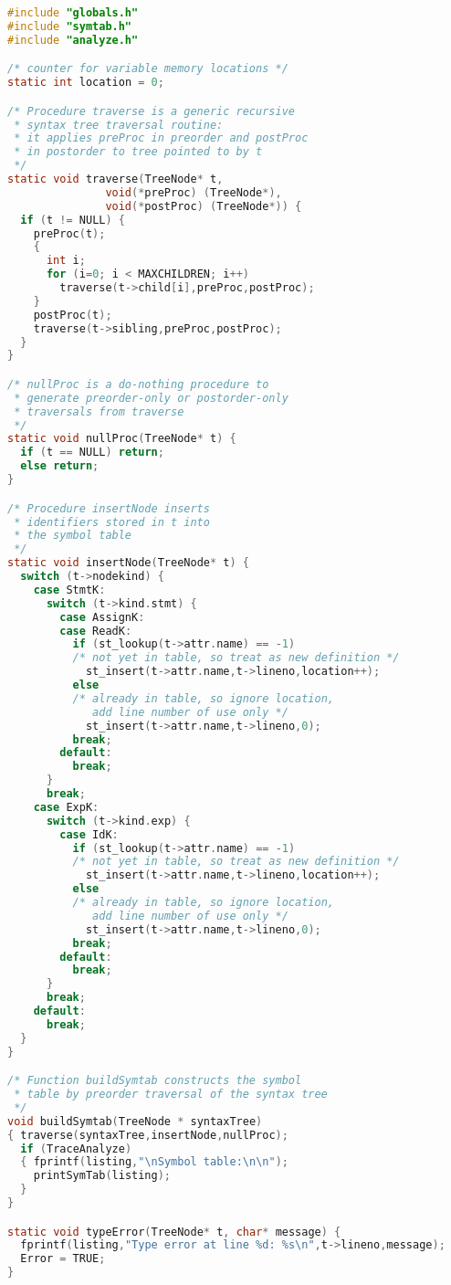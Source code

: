 \documentclass[lang=cn,10pt]{elegantbook}
\begin{document}
\begin{lstlisting}[caption={analyze.c},language=c]
#include "globals.h"
#include "symtab.h"
#include "analyze.h"

/* counter for variable memory locations */
static int location = 0;

/* Procedure traverse is a generic recursive 
 * syntax tree traversal routine:
 * it applies preProc in preorder and postProc 
 * in postorder to tree pointed to by t
 */
static void traverse(TreeNode* t,
               void(*preProc) (TreeNode*),
               void(*postProc) (TreeNode*)) {
  if (t != NULL) {
    preProc(t);
    {
      int i;
      for (i=0; i < MAXCHILDREN; i++)
        traverse(t->child[i],preProc,postProc);
    }
    postProc(t);
    traverse(t->sibling,preProc,postProc);
  }
}

/* nullProc is a do-nothing procedure to 
 * generate preorder-only or postorder-only
 * traversals from traverse
 */
static void nullProc(TreeNode* t) {
  if (t == NULL) return;
  else return;
}

/* Procedure insertNode inserts 
 * identifiers stored in t into 
 * the symbol table 
 */
static void insertNode(TreeNode* t) {
  switch (t->nodekind) {
    case StmtK:
      switch (t->kind.stmt) {
        case AssignK:
        case ReadK:
          if (st_lookup(t->attr.name) == -1)
          /* not yet in table, so treat as new definition */
            st_insert(t->attr.name,t->lineno,location++);
          else
          /* already in table, so ignore location, 
             add line number of use only */ 
            st_insert(t->attr.name,t->lineno,0);
          break;
        default:
          break;
      }
      break;
    case ExpK:
      switch (t->kind.exp) {
        case IdK:
          if (st_lookup(t->attr.name) == -1)
          /* not yet in table, so treat as new definition */
            st_insert(t->attr.name,t->lineno,location++);
          else
          /* already in table, so ignore location, 
             add line number of use only */ 
            st_insert(t->attr.name,t->lineno,0);
          break;
        default:
          break;
      }
      break;
    default:
      break;
  }
}

/* Function buildSymtab constructs the symbol 
 * table by preorder traversal of the syntax tree
 */
void buildSymtab(TreeNode * syntaxTree)
{ traverse(syntaxTree,insertNode,nullProc);
  if (TraceAnalyze)
  { fprintf(listing,"\nSymbol table:\n\n");
    printSymTab(listing);
  }
}

static void typeError(TreeNode* t, char* message) {
  fprintf(listing,"Type error at line %d: %s\n",t->lineno,message);
  Error = TRUE;
}


\end{lstlisting}
\end{document}
